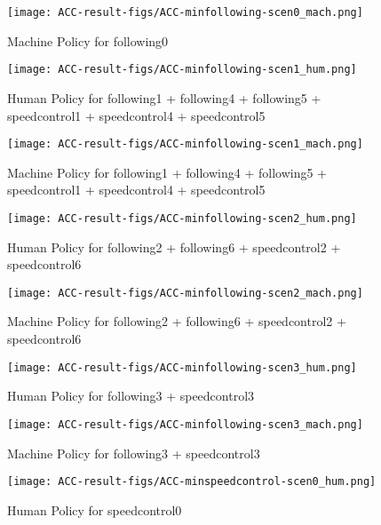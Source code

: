 \begin{figure}[h]
    \texttt{[image: ACC-result-figs/ACC-minfollowing-scen0\_mach.png]}
    \caption{Machine Policy for following0}
    \label{fig:following-s0-mach}
\end{figure}

\begin{figure}[h]
    \texttt{[image: ACC-result-figs/ACC-minfollowing-scen1\_hum.png]}
    \caption{Human Policy for following1 + following4 + following5 + speedcontrol1 + speedcontrol4 + speedcontrol5}
    \label{fig:following-s1-hum}
\end{figure}

\begin{figure}[h]
    \texttt{[image: ACC-result-figs/ACC-minfollowing-scen1\_mach.png]}
    \caption{Machine Policy for following1 + following4 + following5 + speedcontrol1 + speedcontrol4 + speedcontrol5}
    \label{fig:following-s1-mach}
\end{figure}

\begin{figure}[h]
    \texttt{[image: ACC-result-figs/ACC-minfollowing-scen2\_hum.png]}
    \caption{Human Policy for following2 + following6 + speedcontrol2 + speedcontrol6}
    \label{fig:following-s2-hum}
\end{figure}

\begin{figure}[h]
    \texttt{[image: ACC-result-figs/ACC-minfollowing-scen2\_mach.png]}
    \caption{Machine Policy for following2 + following6 + speedcontrol2 + speedcontrol6}
    \label{fig:following-s2-mach}
\end{figure}

\begin{figure}[h]
    \texttt{[image: ACC-result-figs/ACC-minfollowing-scen3\_hum.png]}
    \caption{Human Policy for following3 + speedcontrol3}
    \label{fig:following-s3-hum}
\end{figure}

\begin{figure}[h]
    \texttt{[image: ACC-result-figs/ACC-minfollowing-scen3\_mach.png]}
    \caption{Machine Policy for following3 + speedcontrol3}
    \label{fig:following-s3-mach}
\end{figure}

\begin{figure}[h]
    \texttt{[image: ACC-result-figs/ACC-minspeedcontrol-scen0\_hum.png]}
    \caption{Human Policy for speedcontrol0}
    \label{fig:speedcontrol-s0-hum}
\end{figure}

